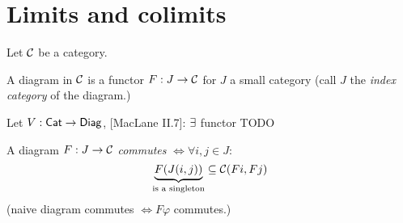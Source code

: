 \documentclass[a4paper]{report}
\begin{document}
\section{Limits and colimits}
Let $\mathcal{C}$ be a category.
\begin{defi}
  A diagram in $\mathcal{C}$ is a functor $F: J \to \mathcal{C}$ for $J$ a small category (call $J$ the \emph{index category} of the diagram.)
\end{defi}
\begin{rem*}Let $V: \mathsf{Cat} \to \mathsf{Diag}$, [MacLane II.7]: $\exists$ functor TODO

\end{rem*}

\begin{defi}
  A diagram $F: J \to \mathcal{C}$ \emph{commutes} $\iff \forall i, j \in J$: \[\underbrace{F(J(i,j))}_{\text{is a singleton}} \subseteq \mathcal{C}(F i, Fj)\]
  (naive diagram commutes $\iff F\varphi$ commutes.)
\end{defi}
\end{document}
